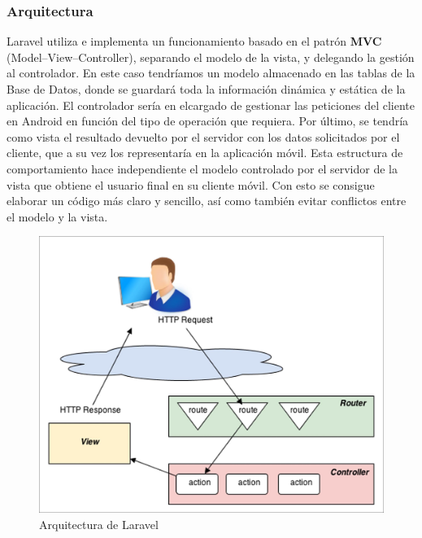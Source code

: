 \subsubsection{Arquitectura} \label{ref:sssec:laravelArch}

Laravel utiliza e implementa un funcionamiento basado en el patrón \textbf{MVC} (Model–View–Controller), separando el modelo de la vista, y delegando la gestión al controlador. En este caso tendríamos un modelo almacenado en las tablas de la Base de Datos, donde se guardará toda la información dinámica y estática de la aplicación. El controlador sería en elcargado de gestionar las peticiones del cliente en Android en función del tipo de operación que requiera. Por último, se tendría como vista el resultado devuelto por el servidor con los datos solicitados por el cliente, que a su vez los representaría en la aplicación móvil. Esta estructura de comportamiento hace independiente el modelo controlado por el servidor de la vista que obtiene el usuario final en su cliente móvil. Con esto se consigue elaborar un código más claro y sencillo, así como también evitar conflictos entre el modelo y la vista.

\begin{figure}[!]
\centering
\includegraphics[keepaspectratio, scale=0.8]{Media/Captures/laravelArch.jpg}
\caption{Arquitectura de Laravel}
\label{fig:laravelArch}
\end{figure}

